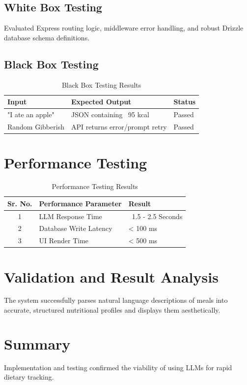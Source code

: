 \documentclass[12pt,a4paper]{report}
\begin{document}
\subsection{White Box Testing}
Evaluated Express routing logic, middleware error handling, and robust Drizzle database schema definitions.

\subsection{Black Box Testing}
\begin{table}[H]
\centering
\begin{tabular}{|l|l|l|}
\hline
\textbf{Input} & \textbf{Expected Output} & \textbf{Status} \\ \hline
"I ate an apple" & JSON containing ~95 kcal & Passed \\ \hline
Random Gibberish & API returns error/prompt retry & Passed \\ \hline
\end{tabular}
\caption{Black Box Testing Results}
\end{table}

\section{Performance Testing}
\begin{table}[H]
\centering
\begin{tabular}{|c|l|l|}
\hline
\textbf{Sr. No.} & \textbf{Performance Parameter} & \textbf{Result} \\ \hline
1 & LLM Response Time & ~1.5 - 2.5 Seconds \\ \hline
2 & Database Write Latency & < 100 ms \\ \hline
3 & UI Render Time & < 500 ms \\ \hline
\end{tabular}
\caption{Performance Testing Results}
\end{table}

\section{Validation and Result Analysis}
The system successfully parses natural language descriptions of meals into accurate, structured nutritional profiles and displays them aesthetically.

\section{Summary}
Implementation and testing confirmed the viability of using LLMs for rapid dietary tracking.
\end{document}
